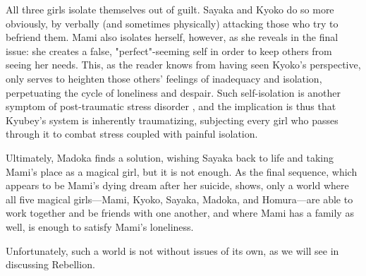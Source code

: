 All three girls isolate themselves out of guilt. Sayaka and Kyoko do so more obviously, by verbally (and sometimes physically) attacking those who try to befriend them. Mami also isolates herself, however, as she reveals in the final issue: she creates a false, "perfect"-seeming self in order to keep others from seeing her needs. This, as the reader knows from having seen Kyoko's perspective, only serves to heighten those others' feelings of inadequacy and isolation, perpetuating the cycle of loneliness and despair. Such self-isolation is another symptom of post-traumatic stress disorder \cite{ref107}, and the implication is thus that Kyubey's system is inherently traumatizing, subjecting every girl who passes through it to combat stress coupled with painful isolation.

Ultimately, Madoka finds a solution, wishing Sayaka back to life and taking Mami's place as a magical girl, but it is not enough. As the final sequence, which appears to be Mami's dying dream after her suicide, shows, only a world where all five magical girls—Mami, Kyoko, Sayaka, Madoka, and Homura—are able to work together and be friends with one another, and where Mami has a family as well, is enough to satisfy Mami's loneliness.

Unfortunately, such a world is not without issues of its own, as we will see in discussing Rebellion.
